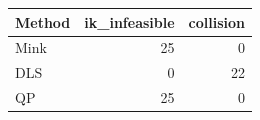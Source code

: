 \begin{tabular}{lrr}
\toprule
Method & ik\_infeasible & collision\\
\midrule
Mink & 25 & 0\\
DLS & 0 & 22\\
QP & 25 & 0\\
\bottomrule
\end{tabular}
